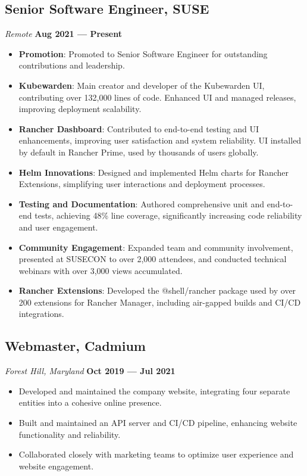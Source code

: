 \documentclass[a4paper,10pt]{article}
\begin{document}
\subsection*{Senior Software Engineer, SUSE}
\textit{Remote} \hfill \textbf{Aug 2021 — Present}
\begin{itemize}[leftmargin=1.5em]
    \item \textbf{Promotion}: Promoted to Senior Software Engineer for outstanding contributions and leadership.
    \item \textbf{Kubewarden}: Main creator and developer of the Kubewarden UI, contributing over 132,000 lines of code. Enhanced UI and managed releases, improving deployment scalability.
    \item \textbf{Rancher Dashboard}: Contributed to end-to-end testing and UI enhancements, improving user satisfaction and system reliability. UI installed by default in Rancher Prime, used by thousands of users globally.
    \item \textbf{Helm Innovations}: Designed and implemented Helm charts for Rancher Extensions, simplifying user interactions and deployment processes.
    \item \textbf{Testing and Documentation}: Authored comprehensive unit and end-to-end tests, achieving 48\% line coverage, significantly increasing code reliability and user engagement.
    \item \textbf{Community Engagement}: Expanded team and community involvement, presented at SUSECON to over 2,000 attendees, and conducted technical webinars with over 3,000 views accumulated.
    \item \textbf{Rancher Extensions}: Developed the @shell/rancher package used by over 200 extensions for Rancher Manager, including air-gapped builds and CI/CD integrations.
\end{itemize}

\subsection*{Webmaster, Cadmium}
\textit{Forest Hill, Maryland} \hfill \textbf{Oct 2019 — Jul 2021}
\begin{itemize}[leftmargin=1.5em]
    \item Developed and maintained the company website, integrating four separate entities into a cohesive online presence.
    \item Built and maintained an API server and CI/CD pipeline, enhancing website functionality and reliability.
    \item Collaborated closely with marketing teams to optimize user experience and website engagement.
\end{itemize}
\end{document}
